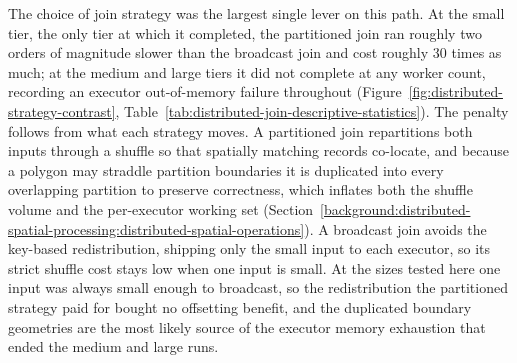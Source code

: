 The choice of join strategy was the largest single lever on this path. At the small tier, the only tier at which it completed, the partitioned join ran roughly two orders of magnitude slower than the broadcast join and cost roughly \num{30} times as much; at the medium and large tiers it did not complete at any worker count, recording an executor out-of-memory failure throughout (Figure~\ref{fig:distributed-strategy-contrast}, Table~\ref{tab:distributed-join-descriptive-statistics}). The penalty follows from what each strategy moves. A partitioned join repartitions both inputs through a shuffle so that spatially matching records co-locate, and because a polygon may straddle partition boundaries it is duplicated into every overlapping partition to preserve correctness, which inflates both the shuffle volume and the per-executor working set \parencite{yu2019_geospark_perspective_beyond} (Section~\ref{background:distributed-spatial-processing:distributed-spatial-operations}). A broadcast join avoids the key-based redistribution, shipping only the small input to each executor, so its strict shuffle cost stays low when one input is small. At the sizes tested here one input was always small enough to broadcast, so the redistribution the partitioned strategy paid for bought no offsetting benefit, and the duplicated boundary geometries are the most likely source of the executor memory exhaustion that ended the medium and large runs.